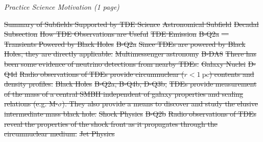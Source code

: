 \documentclass[12pt]{article}
\providecommand{\DIFdeltex}[1]{{\protect\color{red}\sout{#1}}}                      %
\providecommand{\DIFdelbegin}{} %
\providecommand{\DIFdelFL}[1]{\DIFdel{#1}} %
\providecommand{\DIFdel}[1]{\texorpdfstring{\DIFdeltex{#1}}{}} %
\newcommand{\DIFscaledelfig}{0.5}
\newlength{\DIFdelgraphicswidth} %
\newlength{\DIFdelgraphicsheight} %
\newcommand{\DIFdelincludegraphics}[2][]{%
\sbox{\DIFdelgraphicsbox}{\DIFOincludegraphics[#1]{#2}}%
\settoboxwidth{\DIFdelgraphicswidth}{\DIFdelgraphicsbox} %
\settoboxtotalheight{\DIFdelgraphicsheight}{\DIFdelgraphicsbox} %
\scalebox{\DIFscaledelfig}{%
\parbox[b]{\DIFdelgraphicswidth}{\usebox{\DIFdelgraphicsbox}\\[-\baselineskip] \rule{\DIFdelgraphicswidth}{0em}}\llap{\resizebox{\DIFdelgraphicswidth}{\DIFdelgraphicsheight}{%
\setlength{\unitlength}{\DIFdelgraphicswidth}%
\begin{picture}(1,1)%
\thicklines\linethickness{2pt} %
{\color[rgb]{1,0,0}\put(0,0){\framebox(1,1){}}}%
{\color[rgb]{1,0,0}\put(0,0){\line( 1,1){1}}}%
{\color[rgb]{1,0,0}\put(0,1){\line(1,-1){1}}}%
\end{picture}%
}\hspace*{3pt}}} %
} %
\DeclareRobustCommand{\DIFdelbegin}{\DIFOdelbegin \let\includegraphics\DIFdelincludegraphics} %
\begin{document}
\thispagestyle{hdr}

{\it \large Practice Science Motivation (1 page)}

\DIFdelbegin %
{%
\DIFdelFL{Summary of Subfields Supported by TDE Science}}
\DIFdelFL{Astronomical Subfield }%
\DIFdelFL{Decadal Subsection }%
\DIFdelFL{How TDE Observations are Useful }%
\DIFdelFL{TDE Emission }%
\DIFdelFL{B-Q2a }%
\DIFdelFL{--- }%
\DIFdelFL{Transients Powered by Black Holes }%
\DIFdelFL{B-Q2a }%
\DIFdelFL{Since TDEs are powered by Black Holes, they are directly applicable. }%
\DIFdelFL{Multimessenger astronomy }%
\DIFdelFL{B-DA8 }%
\DIFdelFL{There has been some evidence of neutrino detections from nearby TDEs. }%
\DIFdelFL{Galaxy Nuclei }%
\DIFdelFL{D-Q4d }%
\DIFdelFL{Radio observations of TDEs provide circumnuclear ($r < 1~\textrm{pc}$) contents and density profiles. }%
\DIFdelFL{Black Holes }%
\DIFdelFL{B-Q2a, B-Q4b, D-Q3b,  }%
\DIFdelFL{TDEs provide measurement of the mass of a central SMBH independent of galaxy properties and scaling relations (e.g. M-$\sigma$). They also provide a means to discover and study the elusive intermediate mass black hole. }%
\DIFdelFL{Shock Physics }%
\DIFdelFL{B-Q2b }%
\DIFdelFL{Radio observations of TDEs reveal the properties of the shock front as it propagates through the circumnuclear medium. }%
\DIFdelFL{Jet Physics }%
\end{document}
